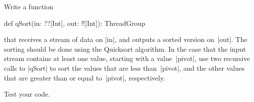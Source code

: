 \begin{questionS}
Write a function
\begin{scala}
  def qSort(in: ??[Int], out: !![Int]): ThreadGroup
\end{scala}
that receives a stream of data on |in|, and outputs a sorted version on~|out|.
The sorting should be done using the Quicksort algorithm.  In the case that
the input stream contains at least one value, starting with a value~|pivot|,
use two recursive calls to |qSort| to sort the values that are less
than~|pivot|, and the other values that are greater than or equal to~|pivot|,
respectively.

Test your code. 
\end{questionS}



